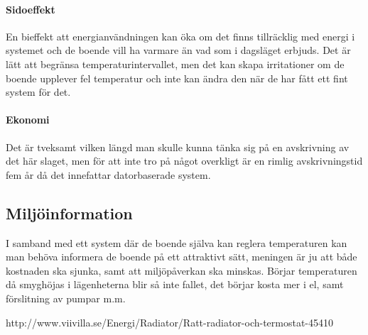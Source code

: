 \paragraph{Sidoeffekt}
En bieffekt att energianvändningen kan öka om det finns tillräcklig med energi i systemet och de boende vill ha varmare än vad som i dagsläget erbjuds. Det är lätt att begränsa temperaturintervallet, men det kan skapa irritationer om de boende upplever fel temperatur och inte kan ändra den när de har fått ett fint system för det.

\paragraph{Ekonomi}
Det är tveksamt vilken längd man skulle kunna tänka sig på en avskrivning av det här slaget, men för att inte tro på något overkligt är en rimlig avskrivningstid fem år då det innefattar datorbaserade system.

\subsection{Miljöinformation}
I samband med ett system där de boende själva kan reglera temperaturen kan man behöva informera de boende på ett attraktivt sätt, meningen är ju att både kostnaden ska sjunka, samt att miljöpåverkan ska minskas. Börjar temperaturen då smyghöjas i lägenheterna blir så inte fallet, det börjar kosta mer i el, samt förslitning av pumpar m.m.

 
http://www.viivilla.se/Energi/Radiator/Ratt-radiator-och-termostat-45410
 


